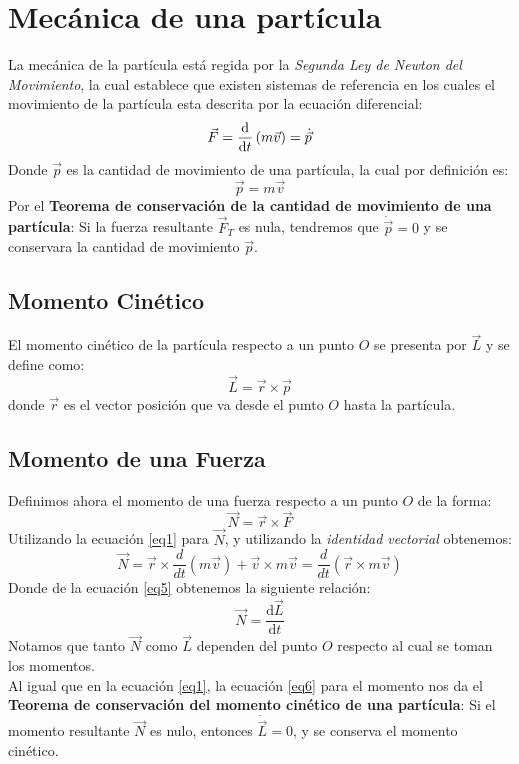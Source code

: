 \documentclass[../main]{subfiles}
\begin{document}
\section{Mecánica de una partícula}
La mecánica de la partícula está regida por la \textit{Segunda Ley de Newton del Movimiento}, la cual establece que existen sistemas de referencia en los cuales el movimiento de la partícula esta descrita por la ecuación diferencial:
    \begin{align}
    \Vec{F}=\dv{}{t}\left(m\Vec{v}\right)=\dot{\vec{p}}
    \label{eq1}
    \end{align}
Donde $\vec{p}$ es la cantidad de movimiento de una partícula, la cual por definición es:
    \begin{equation}
	    \vec{p}=m\vec{v}
	    \label{eq2}
    \end{equation}
Por el \textbf{Teorema de conservación de la cantidad de movimiento de una partícula}: Si la fuerza resultante $\vec{F}_T$ es nula, tendremos que $\dot{\vec{p}}=0$ y se conservara la cantidad de movimiento $\vec{p}$.

\subsection*{Momento Cinético}
El momento cinético de la partícula respecto a un punto $O$ se presenta por $\vec{L}$ y se define como:
	\begin{equation}
	    \vec{L}=\vec{r}\times \vec{p}
	    \label{eq3}
	\end{equation}
donde $\vec{r}$ es el vector posición que va desde el punto $O$ hasta la partícula.

\subsection*{Momento de una Fuerza}
Definimos ahora el momento de una fuerza respecto a un punto $O$ de la forma:
	\begin{equation}
	    \vec{N}=\vec{r}\times \vec{F}
	    \label{eq4}
	\end{equation}
Utilizando la ecuación \eqref{eq1} para $\vec{N}$, y utilizando la \textit{identidad vectorial} obtenemos:
	\begin{equation}
	    \vec{N}=\vec{r}\times \dfrac{d}{dt}(m\vec{v})+\vec{v}\times m\vec{v}=\dfrac{d}{dt}(\vec{r}\times m\vec{v})
	    \label{eq5}
	\end{equation}
Donde de la ecuación \eqref{eq5} obtenemos la siguiente relación:
    \begin{equation}
        \vec{N}=\dfrac{\text{d}\vec{L}}{\text{d}t}
        \label{eq6}
    \end{equation}
Notamos que tanto $\vec{N}$ como $\vec{L}$ dependen del punto $O$ respecto al cual se toman los momentos. \\
Al igual que en la ecuación \eqref{eq1}, la ecuación \eqref{eq6} para el momento nos da el \textbf{Teorema de conservación del momento cinético de una partícula}: Si el momento resultante $\vec{N}$ es nulo, entonces $\dot{\vec{L}}=0$, y se conserva el momento cinético.
\end{document}
